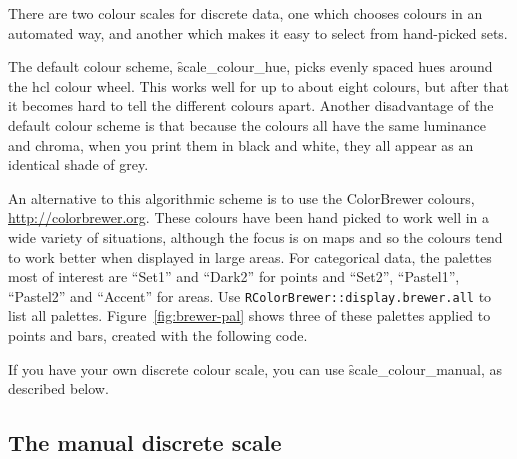 There are two colour scales for discrete data, one which chooses colours in an automated way, and another which makes it easy to select from hand-picked sets.

The default colour scheme, \f{scale_colour_hue}, picks evenly spaced hues around the hcl colour wheel.  This works well for up to about eight colours, but after that it becomes hard to tell the different colours apart.  Another disadvantage of the default colour scheme is that because the colours all have the same luminance and chroma, when you print them in black and white, they all appear as an identical shade of grey.  

An alternative to this algorithmic scheme is to use the ColorBrewer colours, \url{http://colorbrewer.org}. These colours have been hand picked to work well in a wide variety of situations, although the focus is on maps and so the colours tend to work better when displayed in large areas. For categorical data, the palettes most of interest are ``Set1'' and ``Dark2'' for points and ``Set2'', ``Pastel1'', ``Pastel2'' and ``Accent'' for areas. Use {\tt RColorBrewer::display.brewer.all} to list all palettes. Figure~\ref{fig:brewer-pal} shows three of these palettes applied to points and bars, created with the following code.   

% 
% 


If you have your own discrete colour scale, you can use \f{scale_colour_manual}, as described below.

\subsection{The manual discrete scale}
\label{sub:scale-manual}

